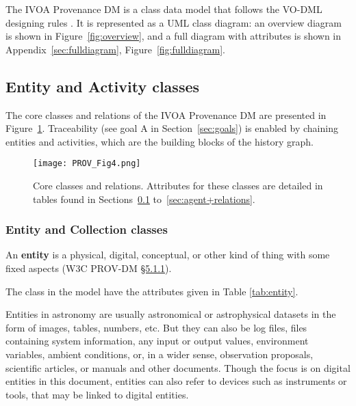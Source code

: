The IVOA Provenance DM is a class data model that follows the VO-DML designing rules \citep{2018ivoa.spec.0910L}. It is represented as a UML class diagram: an overview diagram is shown in Figure~\ref{fig:overview}, and a full diagram with attributes is shown in Appendix~\ref{sec:fulldiagram}, Figure~\ref{fig:fulldiagram}.


\subsection{Entity and Activity classes}
\label{sec:ent_act}

The core classes and relations of the IVOA Provenance DM are presented in Figure~\ref{fig:coreclasses}.
Traceability (see goal A in Section~\ref{sec:goals}) is enabled by chaining entities and activities, which are the building blocks of the history graph.


\begin{figure}[ht]
\centering
\texttt{[image: PROV\_Fig4.png]}
\caption[Core classes and relations]{Core classes and relations. Attributes for these classes are detailed in tables found in Sections~\ref{sec:ent_act} to~\ref{sec:agent+relations}.}
\label{fig:coreclasses}
\end{figure}



\subsubsection{Entity and Collection classes}
\label{sec:Entity}

An \textbf{entity} is a physical, digital, conceptual, or other kind of thing with some fixed aspects (W3C PROV-DM \href{https://www.w3.org/TR/prov-dm/#term-entity}{\S5.1.1}). 

The  class in the model have the attributes given in Table \ref{tab:entity}. 


Entities in astronomy are usually astronomical or astrophysical datasets in the form of images, tables, numbers, etc. But they can also be log files, files containing system information, any input or output values, environment variables, ambient conditions, or, in a wider sense, observation proposals, scientific  articles, or manuals and other documents. 
Though the focus is on digital entities in this document, entities can also refer to devices such as instruments or tools, that may be linked to digital entities.



